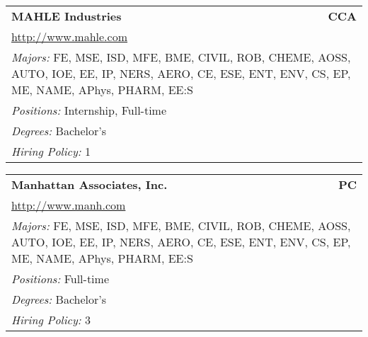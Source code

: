 \documentclass[twoside]{article}
\begin{document}
\begin{center}
\begin{multicols}{3}
\begin{FlushLeft}
\begin{minipage}{.9\columnwidth}
\end{minipage}
 
\begin{minipage}{.9\columnwidth}\begin{tabularx}{.95\columnwidth}{Xr}
                 {\Large\bf MAHLE Industries} & {\Large\bf CCA}\\
    \multicolumn{2}{p{.95\columnwidth}}{\url{http://www.mahle.com}}\\
    \multicolumn{2}{p{.95\columnwidth}}{\emph{Majors:} FE, MSE, ISD, MFE, BME, CIVIL, ROB, CHEME, AOSS, AUTO, IOE, EE, IP, NERS, AERO, CE, ESE, ENT, ENV, CS, EP, ME, NAME, APhys, PHARM, EE:S}\\
    \multicolumn{2}{p{.95\columnwidth}}{\emph{Positions:} Internship, Full-time}\\
    \multicolumn{2}{p{.95\columnwidth}}{\emph{Degrees:} Bachelor's}\\
    \multicolumn{2}{p{.95\columnwidth}}{\emph{Hiring Policy:} 1}\\
    \end{tabularx}
    
\end{minipage}
 
\begin{minipage}{.9\columnwidth}\begin{tabularx}{.95\columnwidth}{Xr}
                 {\Large\bf Manhattan Associates, Inc.} & {\Large\bf PC}\\
    \multicolumn{2}{p{.95\columnwidth}}{\url{http://www.manh.com}}\\
    \multicolumn{2}{p{.95\columnwidth}}{\emph{Majors:} FE, MSE, ISD, MFE, BME, CIVIL, ROB, CHEME, AOSS, AUTO, IOE, EE, IP, NERS, AERO, CE, ESE, ENT, ENV, CS, EP, ME, NAME, APhys, PHARM, EE:S}\\
    \multicolumn{2}{p{.95\columnwidth}}{\emph{Positions:} Full-time}\\
    \multicolumn{2}{p{.95\columnwidth}}{\emph{Degrees:} Bachelor's}\\
    \multicolumn{2}{p{.95\columnwidth}}{\emph{Hiring Policy:} 3}\\
    \end{tabularx}
    
\end{minipage}
 

\end{FlushLeft}
\end{multicols}
\end{center}
\end{document}
